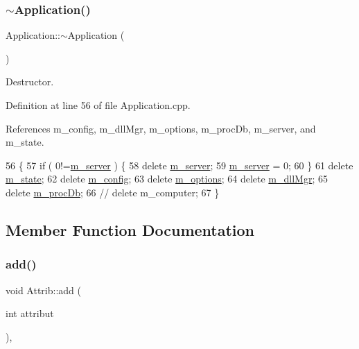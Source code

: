 \subsubsection{\texorpdfstring{$\sim$\+Application()}{~Application()}}
{\footnotesize\ttfamily Application\+::$\sim$\+Application (\begin{DoxyParamCaption}{ }\end{DoxyParamCaption})\hspace{0.3cm}{\ttfamily [virtual]}}



Destructor. 



Definition at line 56 of file Application.\+cpp.



References m\+\_\+config, m\+\_\+dll\+Mgr, m\+\_\+options, m\+\_\+proc\+Db, m\+\_\+server, and m\+\_\+state.


\begin{DoxyCode}
56                           \{
57   \textcolor{keywordflow}{if} (  0!=\hyperlink{classApplication_a5e6085b0f322d5036177b16113a75b56}{m\_server} ) \{
58     \textcolor{keyword}{delete} \hyperlink{classApplication_a5e6085b0f322d5036177b16113a75b56}{m\_server};
59     \hyperlink{classApplication_a5e6085b0f322d5036177b16113a75b56}{m\_server} = 0;
60   \}
61   \textcolor{keyword}{delete} \hyperlink{classApplication_a0ef9832e2d286716e597a1ff21ffcab4}{m\_state};
62   \textcolor{keyword}{delete} \hyperlink{classApplication_ae05f3e253ea871a194c3d30fd1d3b0c3}{m\_config};
63   \textcolor{keyword}{delete} \hyperlink{classApplication_a3b0c74bf1ba99a5042990e3fefaa8963}{m\_options};
64   \textcolor{keyword}{delete} \hyperlink{classApplication_a66b06cbeb824fe00ecd11499fcf01c55}{m\_dllMgr};
65   \textcolor{keyword}{delete} \hyperlink{classApplication_af030cefeb69586f01e965606d5dd8919}{m\_procDb};
66   \textcolor{comment}{//  delete m\_computer;}
67 \}
\end{DoxyCode}


\subsection{Member Function Documentation}
\mbox{\label{classAttrib_a235f773af19c900264a190b00a3b4ad7}} 
\subsubsection{\texorpdfstring{add()}{add()}}
{\footnotesize\ttfamily void Attrib\+::add (\begin{DoxyParamCaption}\item[{int}]{attribut }\end{DoxyParamCaption})\hspace{0.3cm}{\ttfamily [inline]}, {\ttfamily [inherited]}}

